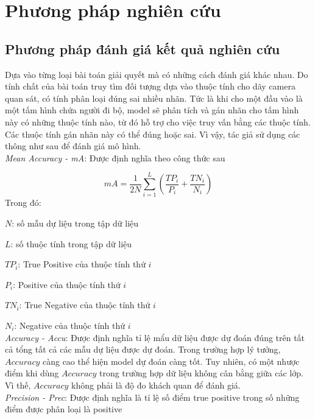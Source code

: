 \section{\texorpdfstring{Phương pháp nghiên cứu}{Method}}
\subsection{\texorpdfstring{Phương pháp đánh giá kết quả nghiên cứu}{Empty}}
Dựa vào từng loại bài toán giải quyết mà có những cách đánh giá khác nhau. Do tính chất của bài toán truy tìm đối tượng dựa vào thuộc tính cho dãy camera quan sát, có tính phân loại đúng sai nhiều nhãn. Tức là khi cho một đầu vào là một tấm hình chứa người đi bộ, model sẽ phân tích và gán nhãn cho tấm hình này có những thuộc tính nào, từ đó hỗ trợ cho việc truy vấn bằng các thuộc tính. Các thuộc tính gán nhãn này có thể đúng hoặc sai. Vì vậy, tác giả sử dụng các thông như sau để đánh giá mô hình.\\

\textit{Mean Accuracy - mA}: Được định nghĩa theo công thức sau 

\begin{equation}
mA = \frac{1}{2N} \sum_{i=1}^{L} (\frac{TP_i}{P_i} + \frac{TN_i}{N_i})
\end{equation}
\indent{}Trong đó:

\indent{}\indent{}$N$: số mẫu dự liệu trong tập dữ liệu

\indent{}\indent{}$L$: số thuộc tính trong tập dữ liệu 

\indent{}\indent{}$TP_i$: True Positive của thuộc tính thứ $i$

\indent{}\indent{}$P_i$: Positive của thuộc tính thứ $i$

\indent{}\indent{}$TN_i$: True Negative của thuộc tính thứ $i$

\indent{}\indent{}$N_i$: Negative của thuộc tính thứ $i$\\

\textit{Accuracy - Accu}: Được định nghĩa tỉ lệ mẩu dữ liệu được dự đoán đúng trên tất cả tổng tất cả các mẫu dự liệu được dự đoán. Trong trường hợp lý tưởng, $Accuracy$ càng cao thể hiện model dự đoán càng tốt. Tuy nhiên, có một nhược điểm khi dùng $Accuracy$ trong trường hợp dữ liệu không cân bằng giữa các lớp. Vì thế, $Accuracy$ không phải là độ đo khách quan để đánh giá.\\

\textit{Precision - Prec}: Được định nghĩa là tỉ lệ số điểm true positive trong số những điểm được phân loại là positive


